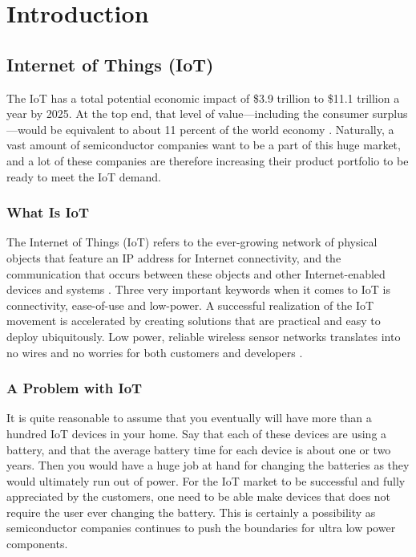 \chapter{Introduction}

\section{Internet of Things (IoT)}

The IoT has a total potential economic impact of \$3.9 trillion to \$11.1 trillion a year by 2025. At the top end, that level of value—including the consumer surplus—would be equivalent to about 11 percent of the world economy \cite{mckinsey15}. Naturally, a vast amount of semiconductor companies want to be a part of this huge market, and a lot of these companies are therefore increasing their product portfolio to be ready to meet the IoT demand. 

\subsection{What Is IoT}

The Internet of Things (IoT) refers to the ever-growing network of physical objects that feature an IP address for Internet connectivity, and the communication that occurs between these objects and other Internet-enabled devices and systems \cite{webopedia}. Three very important keywords when it comes to IoT is connectivity, ease-of-use and low-power. A successful realization of the IoT movement is accelerated by creating solutions that are practical and easy to deploy ubiquitously. Low power, reliable wireless sensor networks translates into no wires and no worries for both customers and developers \cite{embedded_IoT}. 

\subsection{A Problem with IoT}

It is quite reasonable to assume that you eventually will have more than a hundred IoT devices in your home. Say that each of these devices are using a battery, and that the average battery time for each device is about one or two years. Then you would have a huge job at hand for changing the batteries as they would ultimately run out of power. For the IoT market to be successful and fully appreciated by the customers, one need to be able make devices that does not require the user ever changing the battery. This is certainly a possibility as semiconductor companies continues to push the boundaries for ultra low power components.  

